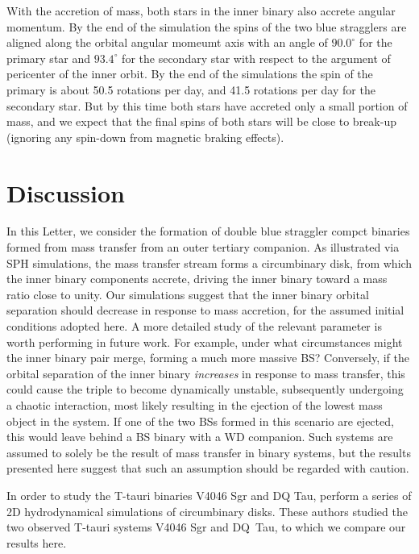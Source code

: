 \documentclass{aastex62}
\begin{document}
With the accretion of mass, both stars in the inner binary also accrete
angular momentum.  By the end of the simulation the spins of the two
blue stragglers are aligned along the orbital angular momeumt axis with
an angle of $90.0^\circ$ for the primary star and $93.4^\circ$ for the
secondary star with respect to the argument of pericenter of the inner
orbit.  By the end of the simulations the spin of the primary is about
50.5 rotations per day, and 41.5 rotations per day for the secondary star. But by this
time both stars have accreted only a small portion of mass, and we expect that
the final spins of both stars will be close to break-up (ignoring any spin-down from magnetic braking effects).

\section{Discussion} \label{sect:discussion}

In this Letter, we consider the formation of double blue straggler compct binaries formed 
from mass transfer from an outer tertiary companion.  As illustrated via SPH simulations, 
the mass transfer stream forms a circumbinary 
disk, from which the inner binary components accrete, driving the inner binary toward a 
mass ratio close to unity.  Our simulations suggest that the inner binary orbital separation 
should decrease in response to mass accretion, for the assumed initial conditions adopted here.  A more 
detailed study of the relevant parameter is worth performing in future work.  For example, under what circumstances 
might the inner binary pair merge, forming a much more massive BS?  Conversely, if the orbital 
separation of the inner binary \textit{increases} in response to mass transfer, this could 
cause the triple to become dynamically unstable, subsequently undergoing a chaotic interaction, most likely 
resulting in the ejection of the lowest mass object in the system.  If one of the two BSs formed in 
this scenario are ejected, this would leave behind a BS binary with a WD companion.  Such systems 
are assumed to solely be the result of mass transfer in binary systems, but the results presented here 
suggest that such an assumption should be regarded with caution.

In order to study the T-tauri binaries V4046 Sgr and DQ Tau, 
\cite{2011MNRAS.413.2679D} perform a series of 2D hydrodynamical
simulations of circumbinary disks.  These authors studied the two observed
T-tauri systems V4046 Sgr and DQ~Tau, to which we compare our results here.
\end{document}
